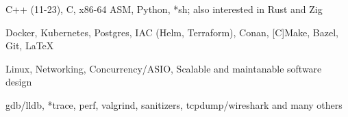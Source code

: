 

\begin{cventries}
    \begin{cvitems} %
      \item{C++ (11-23), C, x86-64 ASM, Python, *sh; also interested in Rust and Zig}
      \item{Docker, Kubernetes, Postgres, IAC (Helm, Terraform), Conan, [C]Make, Bazel, Git, \LaTeX}
      \item{Linux, Networking, Concurrency/ASIO, Scalable and maintanable software design}
      \item{gdb/lldb, *trace, perf, valgrind, sanitizers, tcpdump/wireshark and many others}
    \end{cvitems}

  \bigskip
\end{cventries}

